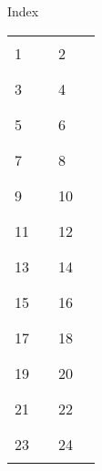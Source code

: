 \newpage
\thispagestyle{empty}

\begin{center}
{\large
Index \vspace{.5in}
}

\begin{tabular}{l l l l }
	1 & \rule{1.75in}{.2pt} & 2 & \rule{1.75in}{.2pt} \vspace{.225in} \\
	3 & \rule{1.75in}{.2pt} & 4 & \rule{1.75in}{.2pt} \vspace{.225in} \\
	5 & \rule{1.75in}{.2pt} & 6 & \rule{1.75in}{.2pt} \vspace{.225in} \\
	7 & \rule{1.75in}{.2pt} & 8 & \rule{1.75in}{.2pt} \vspace{.225in} \\
	9 & \rule{1.75in}{.2pt} & 10 & \rule{1.75in}{.2pt} \vspace{.225in} \\
	11 & \rule{1.75in}{.2pt} & 12 & \rule{1.75in}{.2pt} \vspace{.225in} \\
	13 & \rule{1.75in}{.2pt} & 14 & \rule{1.75in}{.2pt} \vspace{.225in} \\
	15 & \rule{1.75in}{.2pt} & 16 & \rule{1.75in}{.2pt} \vspace{.225in} \\
	17 & \rule{1.75in}{.2pt} & 18 & \rule{1.75in}{.2pt} \vspace{.225in} \\
	19 & \rule{1.75in}{.2pt} & 20 & \rule{1.75in}{.2pt} \vspace{.225in} \\
	21 & \rule{1.75in}{.2pt} & 22 & \rule{1.75in}{.2pt} \vspace{.225in} \\
	23 & \rule{1.75in}{.2pt} & 24 & \rule{1.75in}{.2pt} \vspace{.225in} \\
\end{tabular}

\end{center}

\newpage
\thispagestyle{empty}

